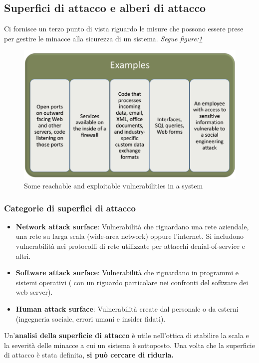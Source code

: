 \documentclass[12pt]{article}
\begin{document}
		\subsection{Superfici di attacco e alberi di attacco}
			Ci fornisce un terzo punto di vista riguardo le misure che possono essere prese per gestire le minacce alla sicurezza di un sistema. 
			 \textit{Segue figure:\ref{fig:7}}
			\begin{figure}[h!]
				\centering
				\includegraphics[scale=0.40]{img/exarea.PNG}
				\caption{Some reachable and exploitable vulnerabilities in a system\label{fig:7}}
			\end{figure}
			\subsubsection{Categorie di superfici di attacco}
				\begin{itemize}
					\item \textbf{Network attack surface}: Vulnerabilità che riguardano una rete aziendale, una rete su larga scala (wide-area network) oppure l'internet. Si includono vulnerabilità nei protocolli di rete utilizzate per attacchi denial-of-service e altri.
					\item \textbf{Software attack surface}: Vulnerabilità che riguardano in programmi e sistemi operativi ( con un riguardo particolare nei confronti del software dei web server).
					\item \textbf{Human attack surface}: Vulnerabilità create dal personale o da esterni (ingegneria sociale, errori umani e insider fidati). 
				\end{itemize}
				Un'\textbf{analisi della superficie di attacco} è utile nell'ottica di stabilire la scala e la severità delle minacce a cui un sistema è sottoposto. Una volta che la superficie di attacco è stata definita, \textbf{si può cercare di ridurla.}
\end{document}
